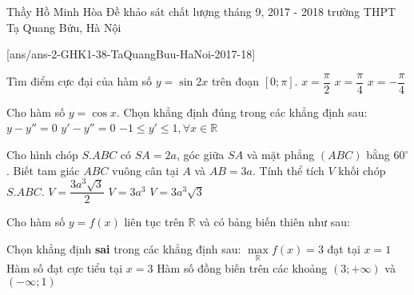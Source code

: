 \begin{name}
{Thầy Hồ Minh Hòa}
{Đề khảo sát chất lượng tháng 9, 2017 - 2018 trường THPT Tạ Quang Bửu, Hà Nội}
\end{name}
\setcounter{ex}{0}
[ans/ans-2-GHK1-38-TaQuangBuu-HaNoi-2017-18]
\begin{ex}%
Tìm điểm cực đại của hàm số $y=\sin 2x$ trên đoạn $\left[ 0;\pi  \right]$.
{$x=\dfrac{\pi}{2}$}
{\True $x=\dfrac{\pi}{4}$}
{$x=-\dfrac{\pi}{4}$}
\end{ex} 
\begin{ex}%
Cho hàm số $y=\cos x$. Chọn khẳng định đúng trong các khẳng định sau:
{$y-y''=0$}
{$y'-y''=0$}
{\True $- 1 \le y' \le 1,\forall x \in \mathbb{R}$}
\end{ex}
\begin{ex}%
Cho hình chóp $S.ABC$ có $SA=2a$, góc giữa $SA$ và mặt phẳng $(ABC)$ bằng $60^\circ$. Biết tam giác $ABC$ vuông cân tại $A$ và $AB=3a$. Tính thể tích $V$ khối chóp $S.ABC$.
{\True $V=\dfrac{3a^3\sqrt{3}}{2}$}
{$V=3a^3$}
{$V=3a^3\sqrt{3}$}
\end{ex}
\begin{ex}%
Cho hàm số $y=f(x)$ liên tục trên $\mathbb{R}$ và có bảng biến thiên như sau:\\
\begin{center}
\end{center}
Chọn khẳng định \textbf{sai} trong các khẳng định sau:
{\True $\mathop {\max }\limits_\mathbb{R} f(x) = 3$ đạt tại $x=1$}
{Hàm số đạt cực tiểu tại $x=3$}
{Hàm số đồng biến trên các khoảng $\left( {3; + \infty } \right)$ và $\left( { - \infty ;1} \right)$}
\end{ex}
\begin{ex}%
{
}
\end{ex} 
